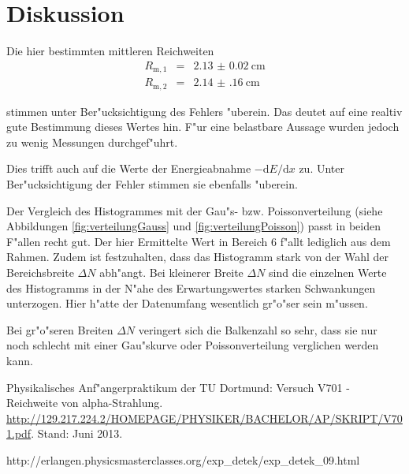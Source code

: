 \section{Diskussion}
\label{sec:diskussion}
	Die hier bestimmten mittleren Reichweiten 
	\begin{eqnarray*}
		R_\mathrm{m,1} & = & \SI{2.13(2)}{\centi \meter} \\	
		R_\mathrm{m,2} & = & \SI{2.14(16)}{\centi \meter}
	\end{eqnarray*}

	stimmen unter Ber"ucksichtigung des Fehlers "uberein.
	Das deutet auf eine realtiv gute Bestimmung dieses Wertes hin.
	F"ur eine belastbare Aussage wurden jedoch zu wenig Messungen durchgef"uhrt.

	Dies trifft auch auf die Werte der Energieabnahme $- \mathrm{d} E / \mathrm{d} x$ zu.
	Unter Ber"ucksichtigung der Fehler stimmen sie ebenfalls "uberein.

	Der Vergleich des Histogrammes mit der Gau"s- bzw. Poissonverteilung (siehe Abbildungen \ref{fig:verteilungGauss} und \ref{fig:verteilungPoisson}) passt in beiden F"allen recht gut.
	Der hier Ermittelte Wert in Bereich 6 f"allt lediglich aus dem Rahmen.
	Zudem ist festzuhalten, dass das Histogramm stark von der Wahl der Bereichsbreite $\Delta N$ abh"angt.
	Bei kleinerer Breite $\Delta N$ sind die einzelnen Werte des Histogramms in der N"ahe des Erwartungswertes starken Schwankungen unterzogen.
	Hier h"atte der Datenumfang wesentlich gr"o"ser sein m"ussen.

	Bei gr"o"seren Breiten $\Delta N$ veringert sich die Balkenzahl so sehr, dass sie nur noch schlecht mit einer Gau"skurve oder Poissonverteilung verglichen werden kann.

\begin{thebibliography}{9}
	 Physikalisches Anf"angerpraktikum der TU Dortmund: Versuch V701 - Reichweite von alpha-Strahlung. \url{http://129.217.224.2/HOMEPAGE/PHYSIKER/BACHELOR/AP/SKRIPT/V701.pdf}. Stand: Juni 2013.

	http://erlangen.physicsmasterclasses.org/exp_detek/exp_detek_09.html
\end{thebibliography}
